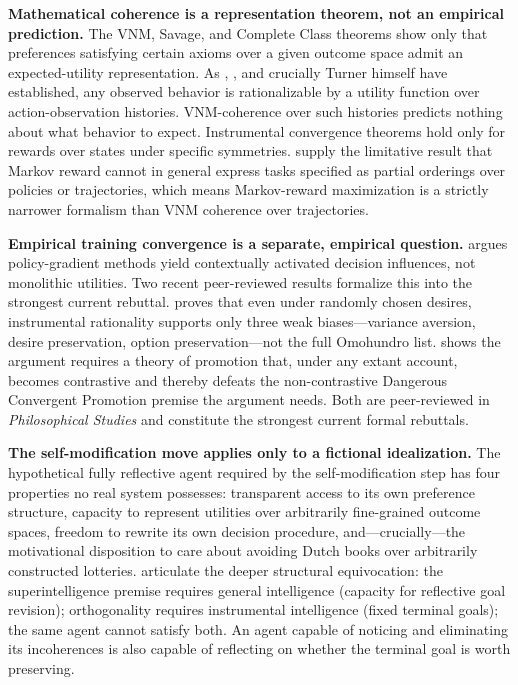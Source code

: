 \documentclass[11pt,twocolumn]{article}
\begin{document}
\textbf{Mathematical coherence is a representation theorem, not an
empirical prediction.} The VNM, Savage, and Complete Class theorems show
only that preferences satisfying certain axioms over a given outcome space
admit an expected-utility representation. As \citet{Ngo2019},
\citet{Shah2018}, and crucially Turner himself \citep{Turner2022a} have
established, any observed behavior is rationalizable by a utility function
over action-observation histories. VNM-coherence over such histories
predicts nothing about what behavior to expect. Instrumental convergence
theorems hold only for rewards over states under specific symmetries.
\citet{Abel2021} supply the limitative result that Markov reward cannot in
general express tasks specified as partial orderings over policies or
trajectories, which means Markov-reward maximization is a strictly
narrower formalism than VNM coherence over trajectories.

\textbf{Empirical training convergence is a separate, empirical question.}
\citet{Turner2022b} argues policy-gradient methods yield contextually
activated decision influences, not monolithic utilities. Two recent
peer-reviewed results formalize this into the strongest current rebuttal.
\citet{Gallow2025} proves that even under randomly chosen desires,
instrumental rationality supports only three weak biases—variance aversion,
desire preservation, option preservation—not the full Omohundro list.
\citet{Sharadin2025} shows the argument requires a theory of promotion
that, under any extant account, becomes contrastive and thereby defeats
the non-contrastive Dangerous Convergent Promotion premise the argument
needs. Both are peer-reviewed in \emph{Philosophical Studies} and
constitute the strongest current formal rebuttals.

\textbf{The self-modification move applies only to a fictional
idealization.} The hypothetical fully reflective agent required by the
self-modification step has four properties no real system possesses:
transparent access to its own preference structure, capacity to represent
utilities over arbitrarily fine-grained outcome spaces, freedom to rewrite
its own decision procedure, and—crucially—the motivational disposition to
care about avoiding Dutch books over arbitrarily constructed lotteries.
\citet{MullerCannon2022} articulate the deeper structural equivocation:
the superintelligence premise requires general intelligence (capacity for
reflective goal revision); orthogonality requires instrumental intelligence
(fixed terminal goals); the same agent cannot satisfy both. An agent
capable of noticing and eliminating its incoherences is also capable of
reflecting on whether the terminal goal is worth preserving.
\end{document}
